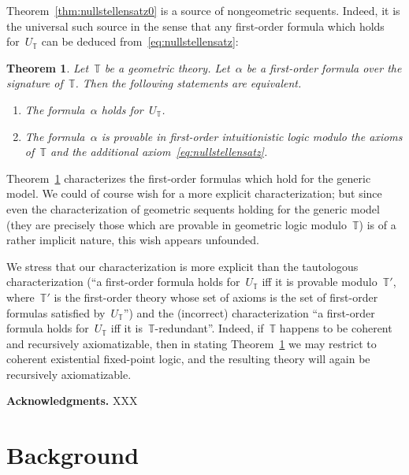 \documentclass[oneside,reqno]{amsart}
\theoremstyle{definition}
\theoremstyle{plain}
\newtheorem{thm}[defn]{Theorem}
\theoremstyle{remark}
\newcommand{\TT}{\mathbb{T}}
\renewcommand{\_}{\mathpunct{.}\,}
\newcommand{\?}{\,{:}\,}
\renewcommand{\paragraph}[1]{\noindent\textbf{#1.}}
\begin{document}
Theorem~\ref{thm:nullstellensatz0} is a source of nongeometric sequents. Indeed,
it is the universal such source in the sense that any first-order formula
which holds for~$U_\TT$ can be deduced from~\eqref{eq:nullstellensatz}:

\begin{thm}\label{thm:characterization0}
Let~$\TT$ be a geometric theory. Let~$\alpha$ be a first-order
formula over the signature of~$\TT$. Then the following statements are
equivalent.
\begin{enumerate}
\item The formula~$\alpha$ holds for~$U_\TT$.
\item The formula~$\alpha$ is provable in first-order intuitionistic logic
modulo the axioms of~$\TT$ and the additional axiom~\eqref{eq:nullstellensatz}.
\end{enumerate}
\end{thm}

Theorem~\ref{thm:characterization0} characterizes the first-order formulas
which hold for the generic model. We could of course wish for a more explicit
characterization; but since even the characterization of geometric sequents
holding for the generic model (they are precisely those which are provable in
geometric logic modulo~$\TT$) is of a rather implicit nature, this wish appears
unfounded.

We stress that our characterization is more explicit than the tautologous
characterization (``a first-order formula holds for~$U_\TT$ iff it is provable
modulo~$\TT'$, where~$\TT'$ is the first-order theory whose set of axioms is the
set of first-order formulas satisfied by~$U_\TT$'') and the (incorrect)
characterization ``a first-order formula holds for~$U_\TT$ iff it
is~$\TT$-redundant''. Indeed, if~$\TT$ happens to be coherent and recursively
axiomatizable, then in stating Theorem~\ref{thm:characterization0} we may
restrict to coherent existential fixed-point logic, and the resulting theory
will again be recursively axiomatizable.
\medskip



\paragraph{Acknowledgments} XXX


\section{Background}
\end{document}
